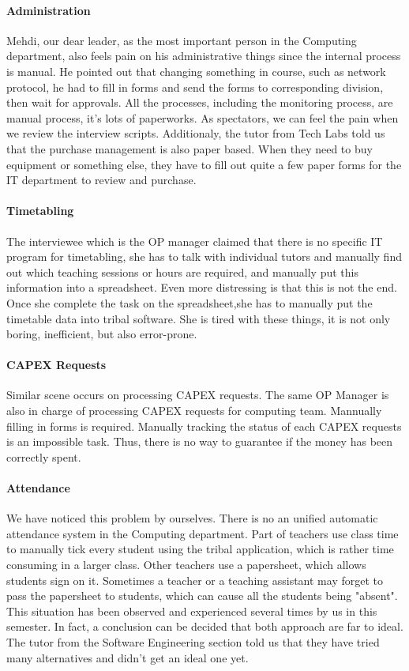 \paragraph{Administration} Mehdi, our dear leader, as the most important person in the Computing department, also feels pain on his administrative things since the internal process is manual. He pointed out that changing something in course, such as network protocol, he had to fill in forms and send the forms to corresponding division, then wait for approvals. All the processes, including the monitoring process, are manual process, it's lots of paperworks. As spectators, we can feel the pain when we review the interview scripts. Additionaly, the tutor from Tech Labs told us that the purchase management is also paper based. When they need to buy equipment or something else, they have to fill out quite a few paper forms for the IT department to review and purchase.

\paragraph{Timetabling} The interviewee which is the OP manager claimed that there is no specific IT program for timetabling, she has to talk with individual tutors and manually find out which teaching sessions or hours are required, and manually put this information into a spreadsheet. Even more distressing is that this is not the end. Once she complete the task on the spreadsheet,she has to manually put the timetable data into tribal software. She is tired with these things, it is not only boring, inefficient, but also error-prone. 

\paragraph{CAPEX Requests} Similar scene occurs on processing CAPEX requests. The same OP Manager is also in charge of processing CAPEX requests for computing team. Mannually filling in forms is required. Manually tracking the status of each CAPEX requests is an impossible task. Thus, there is no way to guarantee if the money has been correctly spent. 

\paragraph{Attendance} We have noticed this problem by ourselves. There is no an unified automatic attendance system in the Computing department. Part of teachers use class time to manually tick every student using the tribal application, which is rather time consuming in a larger class. Other teachers use a papersheet, which allows students sign on it. Sometimes a teacher or a teaching assistant may forget to pass the papersheet to students, which can cause all the students being "absent". This situation has been observed and experienced several times by us in this semester. In fact, a conclusion can be decided that both approach are far to ideal. The tutor from the Software Engineering section told us that they have tried many alternatives and didn't get an ideal one yet.

